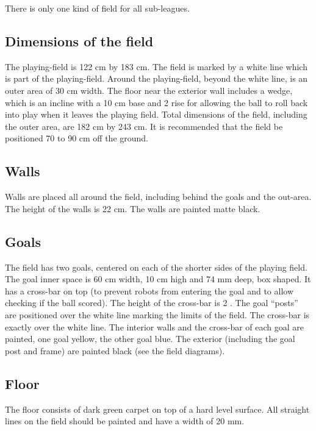 \documentclass{article}
\begin{document}
There is only one kind of field for all sub-leagues.

\subsection{ Dimensions of the field \label{ref-030}}

The playing-field is 122 cm by 183 cm. The field is marked by a white line
which is part of the playing-field. Around the playing-field, beyond the white
line, is an outer area of 30 cm width. The floor near the exterior wall
includes a wedge, which is an incline with a 10 cm base and
2 \added[id=TC]{$\pm$ 1 cm} rise for allowing the ball to roll back into play
when it leaves the playing field.  Total dimensions of the field, including the
outer area, are 182 cm by 243 cm.  It is recommended that the field be
positioned 70 to 90 cm off the ground.

\subsection{ Walls \label{ref-walls}}

Walls are placed all around the field, including behind the goals and the
out-area. The height of the walls is 22 cm. The walls are painted matte black.


\subsection{ Goals \label{ref-032}}

The field has two goals, centered on each of the shorter sides of the playing
field. The goal inner space is 60 cm width, 10 cm high and 74 mm deep, box
shaped. It has a cross-bar on top (to prevent robots from entering the goal and
to allow checking if the ball scored). The height of the cross-bar is 2
\added[id=TC]{$\pm$ 1 cm}. The goal ``posts'' are positioned over the white
line marking the limits of the field. The cross-bar is exactly over the white
line. The interior walls and the cross-bar of each goal are painted, one goal
yellow, the other goal blue. The exterior (including the goal post and frame)
are painted black (see the field diagrams).

\subsection{ Floor \label{ref-033}}

The floor consists of dark green carpet on top of a hard level surface.  All
straight lines on the field should be painted and have a width of 20 mm.
\end{document}
